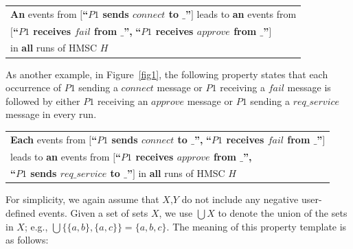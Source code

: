 \documentclass{entcs}
\begin{document}
\begin{tabular}{|l|}
\hline
{\bf An} events from {\bf $[$``$P1$ sends $connect$ to $\_$''$]$} 
leads to {\bf an} events from \\
{\bf $[$``$P1$ receives $fail$ from $\_$'',} 
{\bf ``$P1$ receives $approve$ from $\_$''$]$} \\
in {\bf all} runs of HMSC {\bf $H$} \\
\hline
\end{tabular}

As another example, in Figure~\ref{fig1}, the following property 
states that each occurrence of $P1$ sending a $connect$ 
message or $P1$ receiving a $fail$ message is followed 
by either $P1$ receiving an $approve$ message or $P1$ 
sending a $req\_service$ message in every run.

\begin{tabular}{|l|}
\hline
{\bf Each} events from {\bf $[$``$P1$ sends $connect$ to $\_$'',}
{\bf ``$P1$ receives $fail$ from $\_$''$]$} \\ 
leads to {\bf an} events from {\bf $[$``$P1$ receives $approve$ from $\_$'',} \\
{\bf ``$P1$ sends $req\_service$ to $\_$''$]$} in {\bf all} runs of HMSC {\bf $H$} \\
\hline
\end{tabular}

For simplicity, we again assume that $X$,$Y$ do not 
include any negative user-defined events. Given a set 
of sets $X$, we use $\bigcup X$ to denote the union
of the sets in $X$; e.g., 
$\bigcup\{\{a,b\},\{a,c\}\} = \{a,b,c\}$. The meaning of this 
property template is as follows:
\end{document}
